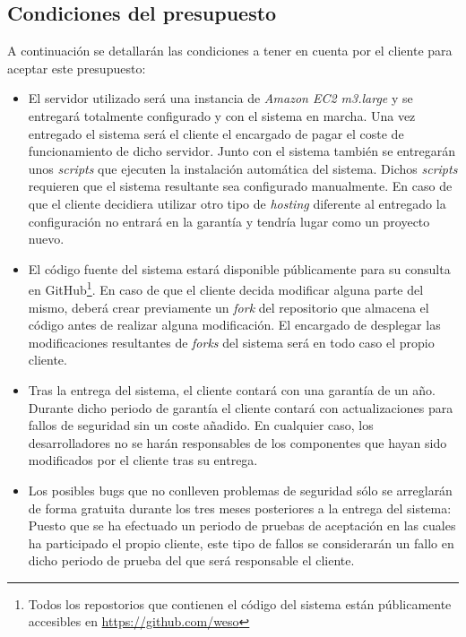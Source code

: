 \subsection{Condiciones del presupuesto}
A continuación se detallarán las condiciones a tener en cuenta por el cliente para aceptar este presupuesto:
\begin{itemize}
	\item El servidor utilizado será una instancia de \textit{Amazon EC2 m3.large} y se entregará totalmente configurado y con el sistema en marcha.  Una vez entregado el sistema será el cliente el encargado de pagar el coste de funcionamiento de dicho servidor.  Junto con el sistema también se entregarán unos \textit{scripts} que ejecuten la instalación automática del sistema.  Dichos \textit{scripts} requieren que el sistema resultante sea configurado manualmente.  En caso de que el cliente decidiera utilizar otro tipo de \textit{hosting} diferente al entregado la configuración no entrará en la garantía y tendría lugar como un proyecto nuevo.
	
	\item El código fuente del sistema estará disponible públicamente para su consulta en GitHub\footnote{Todos los repostorios que contienen el código del sistema están públicamente accesibles en \url{https://github.com/weso}}.  En caso de que el cliente decida modificar alguna parte del mismo, deberá crear previamente un \textit{fork} del repositorio que almacena el código antes de realizar alguna modificación.  El encargado de desplegar las modificaciones resultantes de \textit{forks} del sistema será en todo caso el propio cliente.
	
	\item Tras la entrega del sistema, el cliente contará con una garantía de un año.  Durante dicho periodo de garantía el cliente contará con actualizaciones para fallos de seguridad sin un coste añadido.  En cualquier caso, los desarrolladores no se harán responsables de los componentes que hayan sido modificados por el cliente tras su entrega.
	
	\item Los posibles bugs que no conlleven problemas de seguridad sólo se arreglarán de forma gratuita durante los tres meses posteriores a la entrega del sistema: Puesto que se ha efectuado un periodo de pruebas de aceptación en las cuales ha participado el propio cliente, este tipo de fallos se considerarán un fallo en dicho periodo de prueba del que será responsable el cliente.
\end{itemize}